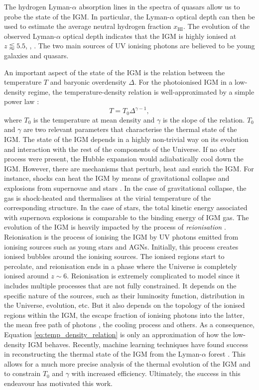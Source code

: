 The hydrogen Lyman-$\alpha$ absorption lines in the spectra of quasars allow us to probe the state of the IGM. In particular, the Lyman-$\alpha$ optical depth can then be used to estimate the average neutral hydrogen fraction $x_\text{HI}$. The evolution of the observed Lyman-$\alpha$ optical depth indicates that the IGM is highly ionised at $z\lessapprox 5.5$, \cite{Becker_2001_GP_trough}, \cite{Ian_model_inde_reio}. The two main sources of UV ionising photons are believed to be young galaxies and quasars.

An important aspect of the state of the IGM is the relation between the temperature $T$ and baryonic overdensity $\Delta$. For the photoionised IGM in a low-density regime, the temperature-density relation is well-approximated by a simple power law \cite{Hui_1997}:
\begin{equation}\label{eq:temp_density_relation}
    T = T_0\Delta^{\gamma-1},
\end{equation}
where $T_0$ is the temperature at mean density and $\gamma$ is the slope of the relation. $T_0$ and $\gamma$ are two relevant parameters that characterise the thermal state of the IGM. The state of the IGM depends in a highly non-trivial way on its evolution and interaction with the rest of the components of the Universe. If no other process were present, the Hubble expansion would adiabatically cool down the IGM. However, there are mechanisms that perturb, heat and enrich the IGM. For instance, shocks can heat the IGM by means of gravitational collapse and explosions from supernovae and stars \cite{Ikeuchi1986}. In the case of gravitational collapse, the gas is shock-heated and thermalises at the virial temperature of the corresponding structure. In the case of stars, the total kinetic energy associated with supernova explosions is comparable to the binding energy of IGM gas. The evolution of the IGM is heavily impacted by the process of \emph{reionisation} \cite{Zaroubi_2012}. Reionisation is the process of ionising the IGM by UV photons emitted from ionising sources such as young stars and AGNs. Initially, this process creates ionised bubbles around the ionising sources. The ionised regions start to percolate, and reionisation ends in a phase where the Universe is completely ionised around $z\sim 6$. Reionisation is extremely complicated to model since it includes multiple processes that are not fully constrained. It depends on the specific nature of the sources, such as their luminosity function, distribution in the Universe, evolution, etc. But it also depends on the topology of the ionised regions within the IGM, the escape fraction of ionising photons into the latter, the mean free path of photons \cite{Davies2022_MFP}, the cooling process and others. As a consequence, Equation \ref{eq:temp_density_relation} is only an approximation of how the low-density IGM behaves. Recently, machine learning techniques have found success in reconstructing the thermal state of the IGM from the Lyman-$\alpha$ forest \cite{nasir2024deep}. This allows for a much more precise analysis of the thermal evolution of the IGM and to constrain $T_0$ and $\gamma$ with increased efficiency. Ultimately, the success in this endeavour has motivated this work.





